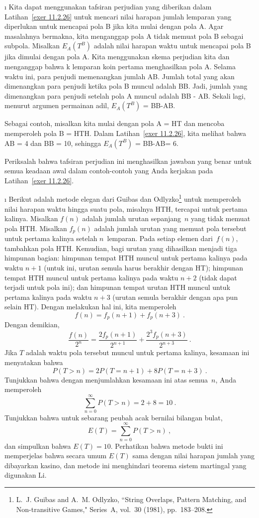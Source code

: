\begin{LJSItem}
\i\label{exer 11.2.27} Kita dapat menggunakan tafsiran perjudian yang diberikan
dalam Latihan~\ref{exer 11.2.26} untuk mencari nilai harapan jumlah lemparan yang
diperlukan untuk mencapai pola B jika kita mulai dengan pola A. Agar masalahnya
bermakna, kita menganggap pola A tidak memuat pola B sebagai subpola. Misalkan
$E_A(T^B)$ adalah nilai harapan waktu untuk mencapai pola B jika dimulai dengan
pola A. Kita menggunakan skema perjudian kita dan menganggap bahwa k lemparan
koin pertama menghasilkan pola A. Selama waktu ini, para penjudi memenangkan
jumlah AB. Jumlah total yang akan dimenangkan para penjudi ketika pola B muncul
adalah BB. Jadi, jumlah yang dimenangkan para penjudi setelah pola A muncul
adalah BB - AB. Sekali lagi, menurut argumen permainan adil,
$E_A(T^B)$ = BB-AB.
\par
Sebagai contoh, misalkan kita mulai dengan pola A = HT dan mencoba memperoleh
pola B = HTH. Dalam Latihan~\ref{exer 11.2.26}, kita melihat bahwa AB = 4 dan
BB = 10, sehingga $E_A(T
^B)$ = BB-AB= 6.
\par
Periksalah bahwa tafsiran perjudian ini menghasilkan jawaban yang benar untuk
semua keadaan awal dalam contoh-contoh yang Anda kerjakan pada
Latihan~\ref{exer 11.2.26}.

\i\label{exer 11.2.28} Berikut adalah metode elegan dari Guibas dan
Odlyzko\footnote{L.~J.
Guibas and A.~M. Odlyzko, ``String Overlaps, Pattern Matching, and
Non-transitive Games,"
 Series~A, vol.~30 (1981),
pp.~183--208.} untuk memperoleh nilai harapan waktu hingga suatu pola, misalnya
HTH, tercapai untuk pertama kalinya. Misalkan $f(n)$ adalah jumlah urutan
sepanjang~$n$ yang tidak memuat pola HTH. Misalkan $f_p(n)$ adalah jumlah urutan
yang memuat pola tersebut untuk pertama kalinya setelah $n$~lemparan. Pada
setiap elemen dari~$f(n)$, tambahkan pola HTH. Kemudian, bagi urutan yang
dihasilkan menjadi tiga himpunan bagian: himpunan tempat HTH muncul untuk pertama
kalinya pada waktu $n + 1$ (untuk ini, urutan semula harus berakhir dengan HT);
himpunan tempat HTH muncul untuk pertama kalinya pada waktu $n + 2$ (tidak dapat
terjadi untuk pola ini); dan himpunan tempat urutan HTH muncul untuk pertama
kalinya pada waktu $n + 3$ (urutan semula berakhir dengan apa pun selain HT).
Dengan melakukan hal ini, kita memperoleh
$$
f(n) = f_p(n + 1) + f_p(n + 3)\ .
$$
Dengan demikian,
$$
\frac{f(n)}{2^n} = \frac{2f_p(n + 1)}{2^{n + 1}} + \frac{2^3f_p(n + 3)}{2^{n +
3}}\ .
$$
Jika $T$ adalah waktu pola tersebut muncul untuk pertama kalinya, kesamaan ini
menyatakan bahwa
$$
P(T > n) = 2P(T = n + 1) + 8P(T = n + 3)\ .
$$
Tunjukkan bahwa dengan menjumlahkan kesamaan ini atas semua~$n$, Anda memperoleh
$$
\sum_{n = 0}^\infty P(T > n) = 2 + 8 = 10\ .
$$
Tunjukkan bahwa untuk sebarang peubah acak bernilai bilangan bulat,
$$
E(T) = \sum_{n = 0}^\infty P(T > n)\ ,
$$
dan simpulkan bahwa $E(T) = 10$. Perhatikan bahwa metode bukti ini memperjelas
bahwa secara umum $E(T)$ sama dengan nilai harapan jumlah yang dibayarkan kasino,
dan metode ini menghindari teorema sistem martingal yang digunakan Li.


\end{LJSItem}

